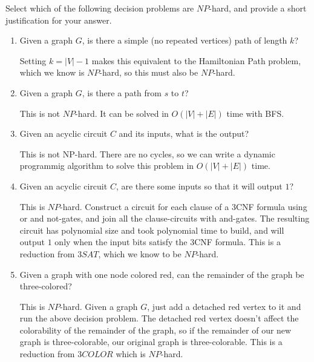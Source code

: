 \documentclass[fleqn]{article}
\begin{document}
\noindent Select which of the following decision problems are $NP$-hard, and provide a short justification for your answer.
\begin{enumerate}
    \item Given a graph $G$, is there a simple (no repeated vertices) path of length $k$?
    \begin{answer}
        Setting $k=|V|-1$ makes this equivalent to the Hamiltonian Path problem, which we know is $NP$-hard, so this must also be $NP$-hard.
    \end{answer}
    \item Given a graph $G$, is there a path from $s$ to $t$?
    \begin{answer}
        This is not $NP$-hard. It can be solved in $O(|V| + |E|)$ time with BFS.
    \end{answer}
    \item Given an acyclic circuit $C$ and its inputs, what is the output?
    \begin{answer}
        This is not NP-hard. There are no cycles, so we can write a dynamic programmig algorithm to solve this problem in $O(|V| + |E|)$ time. 
    \end{answer}
    \item Given an acyclic circuit $C$, are there some inputs so that it will output $1$?
    \begin{answer}
        This is $NP$-hard. Construct a circuit for each clause of a 3CNF formula using or and not-gates, and join all the clause-circuits
        with and-gates. The resulting circuit has polynomial size and took polynomial time to build, and will output $1$ only when the input bits satisfy the 3CNF formula. This is a reduction from $3SAT$, which we know to be $NP$-hard.
    \end{answer}
    \item Given a graph with one node colored red, can the remainder of the graph be three-colored?
    \begin{answer}
        This is $NP$-hard. Given a graph $G$, just add a detached red vertex to it and run the above decision problem. The detached red vertex doesn't affect the colorability of the remainder of the graph, so if the remainder of our new graph is three-colorable, our original graph is three-colorable. This is a reduction from $3COLOR$ which is $NP$-hard.
    \end{answer}
\end{enumerate}
\end{document}

